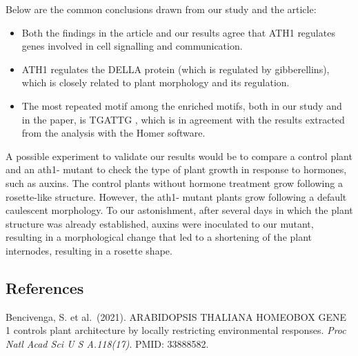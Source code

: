 \documentclass[
]{article}
\begin{document}
Below are the common conclusions drawn from our study and the article:

\begin{itemize}
\item
  Both the findings in the article and our results agree that ATH1
  regulates genes involved in cell signalling and communication.
\item
  ATH1 regulates the DELLA protein (which is regulated by gibberellins),
  which is closely related to plant morphology and its regulation.
\item
  The most repeated motif among the enriched motifs, both in our study
  and in the paper, is TGATTG , which is in agreement with the results
  extracted from the analysis with the Homer software.
\end{itemize}

A possible experiment to validate our results would be to compare a
control plant and an ath1- mutant to check the type of plant growth in
response to hormones, such as auxins. The control plants without hormone
treatment grow following a rosette-like structure. However, the ath1-
mutant plants grow following a default caulescent morphology. To our
astonishment, after several days in which the plant structure was
already established, auxins were inoculated to our mutant, resulting in
a morphological change that led to a shortening of the plant internodes,
resulting in a rosette shape.

\hypertarget{references}{%
\subsection{References}\label{references}}

Bencivenga, S. et al.~(2021). ARABIDOPSIS THALIANA HOMEOBOX GENE 1
controls plant architecture by locally restricting environmental
responses. \emph{Proc Natl Acad Sci U S A.118(17)}. PMID: 33888582.
\end{document}
